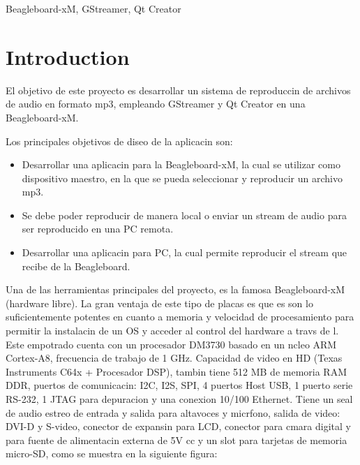 \documentclass[%
	final,
	reprint,
	notitlepage,
	narroweqnarray,
	inline,
	twoside,
        invited,
	]{ieee}
\begin{document}
\begin{keywords}
Beagleboard-xM, GStreamer, Qt Creator
\end{keywords}

\section{Introduction}

\PARstart El objetivo de este proyecto es desarrollar un sistema de reproduccin de archivos de audio en formato mp3, empleando GStreamer y Qt Creator en una Beagleboard-xM.

Los principales objetivos de diseo de la aplicacin son:

\begin{itemize}
\item Desarrollar una aplicacin para la Beagleboard-xM, la cual se utilizar como dispositivo maestro, en la que se pueda seleccionar y reproducir un archivo mp3.
\item Se debe poder reproducir de manera local o enviar un stream de audio para ser reproducido en una PC remota. 
\item Desarrollar una aplicacin para PC, la cual permite reproducir el stream que recibe de la Beagleboard.
\end{itemize}

Una de las herramientas principales del proyecto, es la famosa Beagleboard-xM (hardware libre). La gran ventaja de este tipo de placas es que es son lo suficientemente potentes en cuanto a memoria y velocidad de procesamiento para permitir la instalacin de un OS y acceder al control del hardware a travs de l. Este empotrado cuenta con un procesador DM3730 basado en un ncleo ARM Cortex-A8, frecuencia de trabajo de 1 GHz. Capacidad de video en HD (Texas Instruments C64x + Procesador DSP), tambin tiene 512 MB de memoria RAM DDR, puertos de comunicacin: I2C, I2S, SPI, 4 puertos Host USB, 1 puerto serie RS-232, 1 JTAG para depuracion y una conexion 10/100 Ethernet. Tiene un seal de audio estreo de entrada y salida para altavoces y micrfono, salida de video: DVI-D y S-video, conector de expansin para LCD, conector para cmara digital y para fuente de alimentacin externa de 5V cc y un slot para tarjetas de memoria micro-SD, como se muestra en la siguiente figura:
\end{document}
